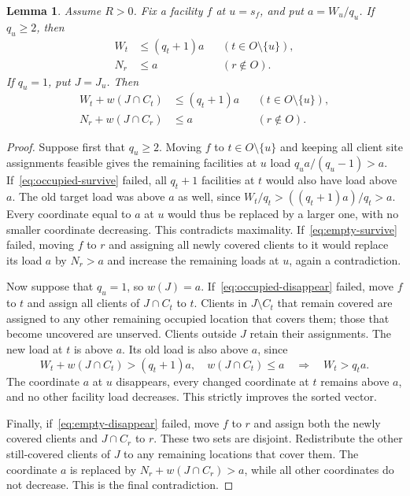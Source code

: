 \documentclass[11pt]{amsart}
\newtheorem{lemma}[theorem]{Lemma}
\theoremstyle{definition}
\newcommand{\set}[1]{\{#1\}}
\begin{document}
\begin{lemma}\label{lem:transfer}
Assume $R>0$. Fix a facility $f$ at $u=s_f$, and put $a=W_u/q_u$. If $q_u\ge2$, then
\begin{align}
 W_t&\le(q_t+1)a &&(t\in O\setminus\set{u}),\label{eq:occupied-survive}\\
 N_r&\le a &&(r\notin O).\label{eq:empty-survive}
\end{align}
If $q_u=1$, put $J=J_u$. Then
\begin{align}
 W_t+w(J\cap C_t)&\le(q_t+1)a &&(t\in O\setminus\set{u}),\label{eq:occupied-disappear}\\
 N_r+w(J\cap C_r)&\le a &&(r\notin O).\label{eq:empty-disappear}
\end{align}
\end{lemma}
\begin{proof}
 Suppose first that $q_u\ge2$. Moving $f$ to $t\in O\setminus\set{u}$ and keeping all client site assignments feasible gives the remaining facilities at $u$ load $q_ua/(q_u-1)>a$. If~\eqref{eq:occupied-survive} failed, all $q_t+1$ facilities at $t$ would also have load above $a$. The old target load was above $a$ as well, since $W_t/q_t>((q_t+1)a)/q_t>a$. Every coordinate equal to $a$ at $u$ would thus be replaced by a larger one, with no smaller coordinate decreasing. This contradicts maximality. If~\eqref{eq:empty-survive} failed, moving $f$ to $r$ and assigning all newly covered clients to it would replace its load $a$ by $N_r>a$ and increase the remaining loads at $u$, again a contradiction.

Now suppose that $q_u=1$, so $w(J)=a$. If~\eqref{eq:occupied-disappear} failed, move $f$ to $t$ and assign all clients of $J\cap C_t$ to $t$. Clients in $J\setminus C_t$ that remain covered are assigned to any other remaining occupied location that covers them; those that become uncovered are unserved. Clients outside $J$ retain their assignments. The new load at $t$ is above $a$. Its old load is also above $a$, since
\[
 W_t+w(J\cap C_t)>(q_t+1)a,
 \quad w(J\cap C_t)\le a
 \quad\Longrightarrow\quad W_t>q_ta.
\]
The coordinate $a$ at $u$ disappears, every changed coordinate at $t$ remains above $a$, and no other facility load decreases. This strictly improves the sorted vector.

Finally, if~\eqref{eq:empty-disappear} failed, move $f$ to $r$ and assign both the newly covered clients and $J\cap C_r$ to $r$. These two sets are disjoint. Redistribute the other still-covered clients of $J$ to any remaining locations that cover them. The coordinate $a$ is replaced by $N_r+w(J\cap C_r)>a$, while all other coordinates do not decrease. This is the final contradiction.
\end{proof}
\end{document}
